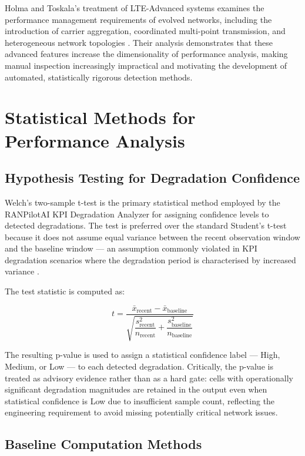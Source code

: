 Holma and Toskala's treatment of LTE-Advanced systems examines the performance management requirements of evolved networks, including the introduction of carrier aggregation, coordinated multi-point transmission, and heterogeneous network topologies \cite{holma2011}. Their analysis demonstrates that these advanced features increase the dimensionality of performance analysis, making manual inspection increasingly impractical and motivating the development of automated, statistically rigorous detection methods.

\section{Statistical Methods for Performance Analysis}

\subsection{Hypothesis Testing for Degradation Confidence}

Welch's two-sample t-test is the primary statistical method employed by the RANPilotAI KPI Degradation Analyzer for assigning confidence levels to detected degradations. The test is preferred over the standard Student's t-test because it does not assume equal variance between the recent observation window and the baseline window — an assumption commonly violated in KPI degradation scenarios where the degradation period is characterised by increased variance \cite{montgomery2018}.

The test statistic is computed as:

\begin{equation}
    t = \frac{\bar{x}_{\text{recent}} - \bar{x}_{\text{baseline}}}{\sqrt{\dfrac{s_{\text{recent}}^2}{n_{\text{recent}}} + \dfrac{s_{\text{baseline}}^2}{n_{\text{baseline}}}}}
\end{equation}

The resulting p-value is used to assign a statistical confidence label — High, Medium, or Low — to each detected degradation. Critically, the p-value is treated as advisory evidence rather than as a hard gate: cells with operationally significant degradation magnitudes are retained in the output even when statistical confidence is Low due to insufficient sample count, reflecting the engineering requirement to avoid missing potentially critical network issues.

\subsection{Baseline Computation Methods}

